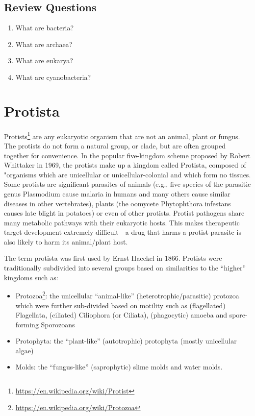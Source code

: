 \documentclass[]{book}
\providecommand{\tightlist}{%
  \setlength{\itemsep}{0pt}\setlength{\parskip}{0pt}}
\let\rmarkdownfootnote\footnote%
\def\footnote{\protect\rmarkdownfootnote}
\renewcommand{\href}[2]{#2\footnote{\url{#1}}}
\begin{document}
\hypertarget{review-questions-9}{%
\section{Review Questions}\label{review-questions-9}}

\begin{enumerate}
\def\labelenumi{\arabic{enumi}.}
\tightlist
\item
  What are bacteria?
\item
  What are archaea?
\item
  What are eukarya?
\item
  What are cyanobacteria?
\end{enumerate}

\hypertarget{protista}{%
\chapter{Protista}\label{protista}}

\href{https://en.wikipedia.org/wiki/Protist}{Protists} are any eukaryotic organism that are not an animal, plant or fungus. The protists do not form a natural group, or clade, but are often grouped together for convenience. In the popular five-kingdom scheme proposed by Robert Whittaker in 1969, the protists make up a kingdom called Protista, composed of "organisms which are unicellular or unicellular-colonial and which form no tissues.
Some protists are significant parasites of animals (e.g., five species of the parasitic genus Plasmodium cause malaria in humans and many others cause similar diseases in other vertebrates), plants (the oomycete Phytophthora infestans causes late blight in potatoes) or even of other protists. Protist pathogens share many metabolic pathways with their eukaryotic hosts. This makes therapeutic target development extremely difficult - a drug that harms a protist parasite is also likely to harm its animal/plant host.

The term protista was first used by Ernst Haeckel in 1866. Protists were traditionally subdivided into several groups based on similarities to the ``higher'' kingdoms such as:

\begin{itemize}
\tightlist
\item
  \href{https://en.wikipedia.org/wiki/Protozoa}{Protozoa}: the unicellular ``animal-like'' (heterotrophic/parasitic) protozoa which were further sub-divided based on motility such as (flagellated) Flagellata, (ciliated) Ciliophora (or Ciliata), (phagocytic) amoeba and spore-forming Sporozoans
\item
  Protophyta: the ``plant-like'' (autotrophic) protophyta (mostly unicellular algae)
\item
  Molds: the ``fungus-like'' (saprophytic) slime molds and water molds.
\end{itemize}
\end{document}
